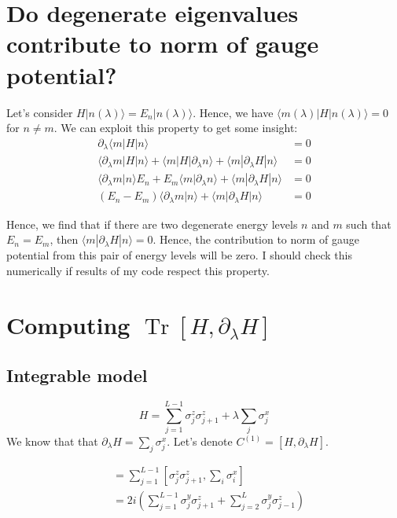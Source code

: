 \documentclass[11pt,a4paper]{article}
\DeclareMathOperator{\Tr}{Tr}
\begin{document}
\appendix
\section{Do degenerate eigenvalues contribute to norm of gauge potential?}\label{sec.deg}
Let's consider $H | n(\lambda) \rangle= E_n  | n(\lambda) \rangle $. Hence, we have $\langle m(\lambda)  |  H | n(\lambda) \rangle=0$ for $n\neq m$. We can exploit this property to get some insight:
\begin{align*}
\partial_{\lambda}\langle m  |  H | n\rangle&=0\\
\langle \partial_{\lambda} m |  H | n \rangle + \langle  m  |  H |\partial_{\lambda} n \rangle + \langle  m  | \partial_{\lambda} H | n \rangle&=0\\
\langle \partial_{\lambda} m   | n \rangle E_n + E_m\langle  m  |   \partial_{\lambda} n \rangle + \langle  m  | \partial_{\lambda} H | n \rangle&=0\\
(E_n - E_m)\langle  \partial_{\lambda} m  |    n \rangle + \langle  m  | \partial_{\lambda} H | n \rangle&=0
\end{align*}

Hence, we find that if there are two degenerate energy levels $n$ and $m$ such that $E_n=E_m$, then $\langle  m  | \partial_{\lambda} H | n \rangle=0$. Hence, the contribution to norm of gauge potential from this pair of energy levels will be zero. I should check this numerically if results of my code respect this property.


\section{Computing $\Tr [H, \partial_{\lambda}H] $}
\subsection{Integrable model}
\begin{equation}
H=  \sum_{j=1}^{L-1} \sigma_j^z \sigma_{j+1}^z + \lambda \sum_{j} \sigma_j^x
\end{equation}
We know that that $\partial_{\lambda}H =  \sum_{j} \sigma_j^x $. Let's denote  $C^{(1)}=[H,\partial_{\lambda}H]$. 


\begin{align*}
[H,\partial_{\lambda}H] & = \sum_{j=1}^{L-1} [\sigma_j^z \sigma_{j+1}^z , \sum_{i} \sigma_i^x]  \\
&= 2i \left(\sum_{j=1}^{L-1} \sigma_j^y \sigma_{j+1}^z + \sum_{j=2}^{L} \sigma_j^y \sigma_{j-1}^z\right)
\end{align*}
\end{document}
